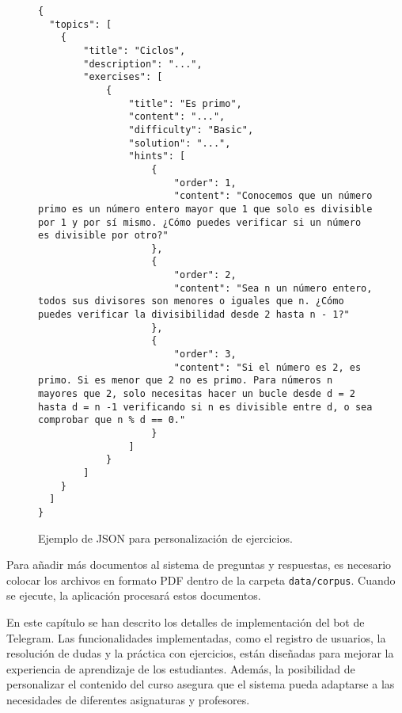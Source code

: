 \begin{figure}[h!]
\begin{lstlisting}
{
  "topics": [
    {
        "title": "Ciclos",
        "description": "...",
        "exercises": [
            {
                "title": "Es primo",
                "content": "...",
                "difficulty": "Basic",
                "solution": "...",
                "hints": [
                    {
                        "order": 1,
                        "content": "Conocemos que un número primo es un número entero mayor que 1 que solo es divisible por 1 y por sí mismo. ¿Cómo puedes verificar si un número es divisible por otro?"
                    },
                    {
                        "order": 2,
                        "content": "Sea n un número entero, todos sus divisores son menores o iguales que n. ¿Cómo puedes verificar la divisibilidad desde 2 hasta n - 1?"
                    },
                    {
                        "order": 3,
                        "content": "Si el número es 2, es primo. Si es menor que 2 no es primo. Para números n mayores que 2, solo necesitas hacer un bucle desde d = 2 hasta d = n -1 verificando si n es divisible entre d, o sea comprobar que n % d == 0."
                    }
                ]
            }
        ]
    }
  ]
}
\end{lstlisting}
\caption{Ejemplo de JSON para personalización de ejercicios.}\label{fig:json}
\end{figure}

Para añadir más documentos al sistema de preguntas y respuestas, es necesario colocar los archivos en formato PDF dentro de la carpeta \texttt{data/corpus}. Cuando se ejecute, la aplicación procesará estos documentos.

En este capítulo se han descrito los detalles de implementación del bot de Telegram. Las funcionalidades implementadas, como el registro de usuarios, la resolución de dudas y la práctica con ejercicios, están diseñadas para mejorar la experiencia de aprendizaje de los estudiantes. Además, la posibilidad de personalizar el contenido del curso asegura que el sistema pueda adaptarse a las necesidades de diferentes asignaturas y profesores.